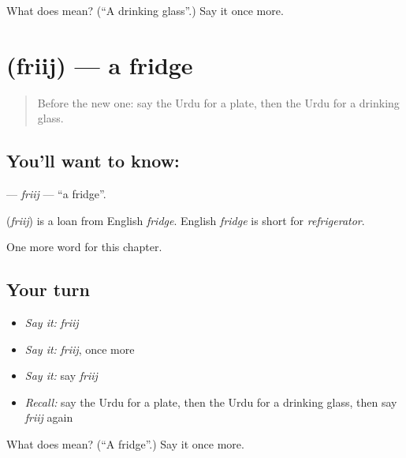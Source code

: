 \begin{tcolorbox}[breakable,colback=teal!4,colframe=teal!35!black,title={Before you move on}]
What does  mean? (\textquotedblleft{}A drinking glass\textquotedblright{}.) Say it once more.
\end{tcolorbox}
\section[\texorpdfstring{\ur{فریج} (friij)}{فریج (friij)}]{ (friij) — a fridge}

\label{lesson:UR-C109-friij}



\begin{quote}
Before the new one: say the Urdu for a plate, then the Urdu for a drinking glass.
\end{quote}

\subsection*{You'll want to know: }
\textbf{} — \emph{friij} — \textquotedblleft{}a fridge\textquotedblright{}.

\begin{cousinweb}
\textbf{} (\emph{friij}) is a loan from English \emph{fridge}. English \emph{fridge} is short for \emph{refrigerator}.
\end{cousinweb}

\begin{grammarlens}[title={What you've built}]
One more word for this chapter.
\end{grammarlens}

\subsection*{Your turn}
\begin{itemize}
\raggedright
  \item \emph{Say it:} \emph{friij}
  \item \emph{Say it:} \emph{friij}, once more
  \item \emph{Say it:} say \emph{friij}
  \item \emph{Recall:} say the Urdu for a plate, then the Urdu for a drinking glass, then say \emph{friij} again
\end{itemize}

\begin{tcolorbox}[breakable,colback=teal!4,colframe=teal!35!black,title={Before you move on}]
What does  mean? (\textquotedblleft{}A fridge\textquotedblright{}.) Say it once more.
\end{tcolorbox}
